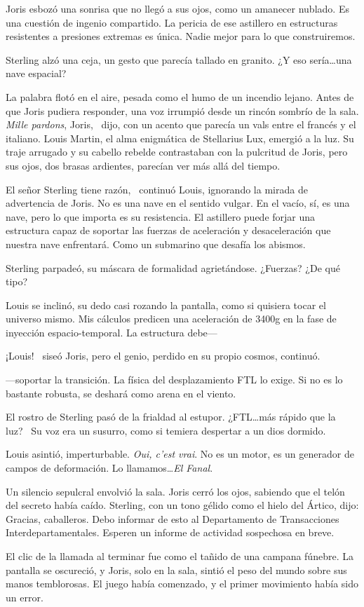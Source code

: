 Joris esbozó una sonrisa que no llegó a sus ojos, como un amanecer nublado. \glqq Es una cuestión de ingenio compartido. La pericia de ese astillero en estructuras resistentes a presiones extremas es única. Nadie mejor para lo que construiremos.\grqq

Sterling alzó una ceja, un gesto que parecía tallado en granito. \glqq ¿Y eso sería\ldots una nave espacial?\grqq

La palabra flotó en el aire, pesada como el humo de un incendio lejano. Antes de que Joris pudiera responder, una voz irrumpió desde un rincón sombrío de la sala. \glqq \emph{Mille pardons}, Joris,\grqq~ dijo, con un acento que parecía un vals entre el francés y el italiano. Louis Martin, el alma enigmática de Stellarius Lux, emergió a la luz. Su traje arrugado y su cabello rebelde contrastaban con la pulcritud de Joris, pero sus ojos, dos brasas ardientes, parecían ver más allá del tiempo.

\glqq El señor Sterling tiene razón,\grqq~ continuó Louis, ignorando la mirada de advertencia de Joris. \glqq No es una nave en el sentido vulgar. En el vacío, sí, es una nave, pero lo que importa es su resistencia. El astillero puede forjar una estructura capaz de soportar las fuerzas de aceleración y desaceleración que nuestra nave enfrentará. Como un submarino que desafía los abismos.\grqq

Sterling parpadeó, su máscara de formalidad agrietándose. \glqq ¿Fuerzas? ¿De qué tipo?\grqq

Louis se inclinó, su dedo casi rozando la pantalla, como si quisiera tocar el universo mismo. \glqq Mis cálculos predicen una aceleración de 3400g en la fase de inyección espacio-temporal. La estructura debe---\grqq

\glqq ¡Louis!\grqq~ siseó Joris, pero el genio, perdido en su propio cosmos, continuó.

\glqq ---soportar la transición. La física del desplazamiento FTL lo exige. Si no es lo bastante robusta, se deshará como arena en el viento.\grqq

El rostro de Sterling pasó de la frialdad al estupor. \glqq ¿FTL\ldots más rápido que la luz?\grqq~ Su voz era un susurro, como si temiera despertar a un dios dormido.

Louis asintió, imperturbable. \glqq \emph{Oui, c’est vrai}. No es un motor, es un generador de campos de deformación. Lo llamamos\ldots \emph{El Fanal}.\grqq

Un silencio sepulcral envolvió la sala. Joris cerró los ojos, sabiendo que el telón del secreto había caído. Sterling, con un tono gélido como el hielo del Ártico, dijo: \glqq Gracias, caballeros. Debo informar de esto al Departamento de Transacciones Interdepartamentales. Esperen un informe de actividad sospechosa en breve.\grqq

El clic de la llamada al terminar fue como el tañido de una campana fúnebre. La pantalla se oscureció, y Joris, solo en la sala, sintió el peso del mundo sobre sus manos temblorosas. El juego había comenzado, y el primer movimiento había sido un error.
